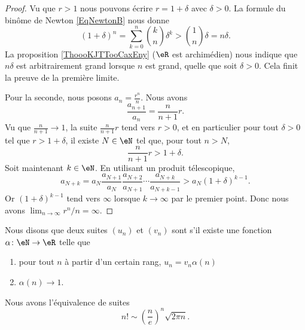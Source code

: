 \begin{proof}
    Vu que \( r>1\) nous pouvons écrire \( r=1+\delta\) avec \( \delta>0\). La formule du binôme de Newton \eqref{EqNewtonB} nous donne
    \begin{equation}
        (1+\delta)^n=\sum_{k=0}^n{k\choose n}\delta^k>{1\choose n}\delta=n\delta.
    \end{equation}
    La proposition \ref{ThoooKJTTooCaxEny} (\( \eR\) est archimédien) nous indique que \( n\delta\) est arbitrairement grand lorsque \( n\) est grand, quelle que soit \( \delta>0\). Cela finit la preuve de la première limite.

    Pour la seconde, nous posons \( a_n=\frac{ r^n }{ n }\). Nous avons
    \begin{equation}
        \frac{ a_{n+1} }{ a_n }=\frac{ n }{ n+1 }r.
    \end{equation}
    Vu que \( \frac{ n }{ n+1 }\to 1\), la suite \( \frac{ n }{ n+1 }r\) tend vers \( r>0\), et en particulier pour tout \( \delta>0\) tel que \( r>1+\delta\), il existe \( N\in \eN\) tel que, pour tout \( n > N \),
    \begin{equation}
        \frac{ n }{ n+1 }r>1+\delta.
    \end{equation}
    Soit maintenant \( k\in \eN\). En utilisant un produit télescopique,
    \begin{equation}
        a_{N+k}=a_N\frac{ a_{N+1} }{ a_N }\frac{ a_{N+2} }{ a_{N+1} }\cdots\frac{ a_{N+k} }{ a_{N+k-1} }>a_N(1+\delta)^{k-1}.
    \end{equation}
    Or \( (1+\delta)^{k-1}\) tend vers \( \infty\) lorsque \( k\to \infty\) par le premier point. Donc nous avons \( \lim_{n\to \infty} r^n/n=\infty\).
\end{proof}


\begin{definition}      \label{DEFooEWRTooKgShmT}
    Nous disons que deux suites \( (u_n)\) et \( (v_n)\) sont  s'il existe une fonction \( \alpha\colon \eN\to \eR\) telle que
    \begin{enumerate}
        \item
            pour tout \( n\) à partir d'un certain rang, \( u_n=v_n\alpha(n)\)
        \item
            \( \alpha(n)\to 1\).
    \end{enumerate}
\end{definition}

\begin{lemma}        \label{LemCEoBqrP}
    Nous avons l'équivalence de suites
    \begin{equation}
        n!\sim \left( \frac{ n }{ e } \right)^n\sqrt{2\pi n}.
    \end{equation}
\end{lemma}

